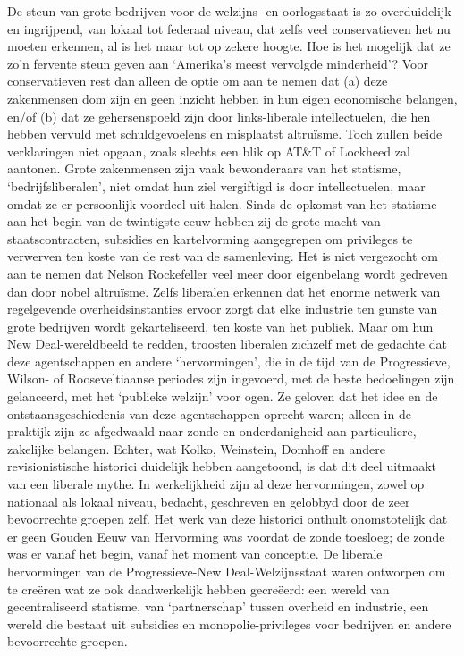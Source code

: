 \documentclass[
  a5paper,
  smalldemyvopaper,10pt,twoside,onecolumn,openright,extrafontsizes,hidelinks]{memoir}
\begin{document}
De steun van grote bedrijven voor de welzijns- en oorlogsstaat is zo
overduidelijk en ingrijpend, van lokaal tot federaal niveau, dat zelfs
veel conservatieven het nu moeten erkennen, al is het maar tot op zekere
hoogte. Hoe is het mogelijk dat ze zo'n fervente steun geven aan
`Amerika's meest vervolgde minderheid'? Voor conservatieven rest dan
alleen de optie om aan te nemen dat (a) deze zakenmensen dom zijn en
geen inzicht hebben in hun eigen economische belangen, en/of (b) dat ze
gehersenspoeld zijn door links-liberale intellectuelen, die hen hebben
vervuld met schuldgevoelens en misplaatst altruïsme. Toch zullen beide
verklaringen niet opgaan, zoals slechts een blik op AT\&T of Lockheed
zal aantonen. Grote zakenmensen zijn vaak bewonderaars van het statisme,
`bedrijfsliberalen', niet omdat hun ziel vergiftigd is door
intellectuelen, maar omdat ze er persoonlijk voordeel uit halen. Sinds
de opkomst van het statisme aan het begin van de twintigste eeuw hebben
zij de grote macht van staatscontracten, subsidies en kartelvorming
aangegrepen om privileges te verwerven ten koste van de rest van de
samenleving. Het is niet vergezocht om aan te nemen dat Nelson
Rockefeller veel meer door eigenbelang wordt gedreven dan door nobel
altruïsme. Zelfs liberalen erkennen dat het enorme netwerk van
regelgevende overheidsinstanties ervoor zorgt dat elke industrie ten
gunste van grote bedrijven wordt gekarteliseerd, ten koste van het
publiek. Maar om hun New Deal-wereldbeeld te redden, troosten liberalen
zichzelf met de gedachte dat deze agentschappen en andere
`hervormingen', die in de tijd van de Progressieve, Wilson- of
Rooseveltiaanse periodes zijn ingevoerd, met de beste bedoelingen zijn
gelanceerd, met het `publieke welzijn' voor ogen. Ze geloven dat het
idee en de ontstaansgeschiedenis van deze agentschappen oprecht waren;
alleen in de praktijk zijn ze afgedwaald naar zonde en onderdanigheid
aan particuliere, zakelijke belangen. Echter, wat Kolko, Weinstein,
Domhoff en andere revisionistische historici duidelijk hebben
aangetoond, is dat dit deel uitmaakt van een liberale mythe. In
werkelijkheid zijn al deze hervormingen, zowel op nationaal als lokaal
niveau, bedacht, geschreven en gelobbyd door de zeer bevoorrechte
groepen zelf. Het werk van deze historici onthult onomstotelijk dat er
geen Gouden Eeuw van Hervorming was voordat de zonde toesloeg; de zonde
was er vanaf het begin, vanaf het moment van conceptie. De liberale
hervormingen van de Progressieve-New Deal-Welzijnsstaat waren ontworpen
om te creëren wat ze ook daadwerkelijk hebben gecreëerd: een wereld van
gecentraliseerd statisme, van `partnerschap' tussen overheid en
industrie, een wereld die bestaat uit subsidies en monopolie-privileges
voor bedrijven en andere bevoorrechte groepen.
\end{document}
